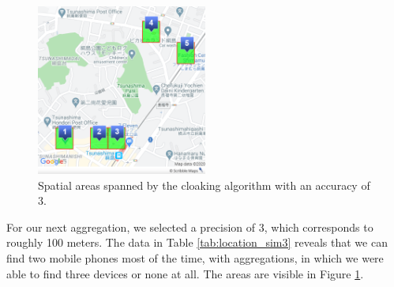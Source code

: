 \begin{figure}[htbp]
  \centering
  \includegraphics[width=0.5\textwidth]{figures/acc3}
  \caption{Spatial areas spanned by the cloaking algorithm with an accuracy of 3.} \label{fig:acc3}
\end{figure}

For our next aggregation, we selected a precision of 3, which corresponds to roughly 100 meters. The data in Table \ref{tab:location_sim3} reveals that we can find two mobile phones most of the time, with aggregations, in which we were able to find three devices or none at all. The areas are visible in Figure \ref{fig:acc3}.

